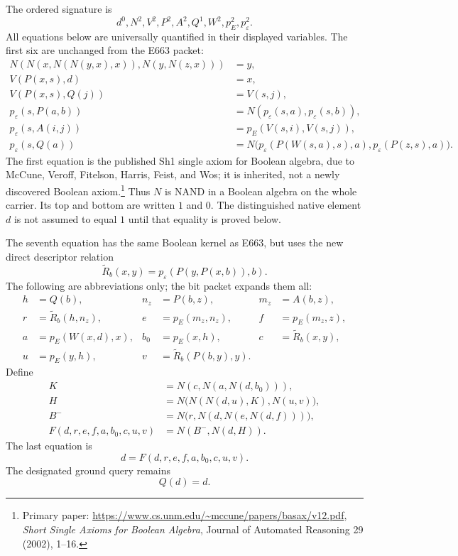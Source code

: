 The ordered signature is
\[
 d^0,N^2,V^2,P^2,A^2,Q^1,W^2,p_E^2,p_\varepsilon^2.
\]
All equations below are universally quantified in their displayed
variables.  The first six are unchanged from the E663 packet:
\begin{align}
 N(N(x,N(N(y,x),x)),N(y,N(z,x)))&=y,\label{eq:e639-sh1}\\
 V(P(x,s),d)&=x,\label{eq:e639-head}\\
 V(P(x,s),Q(j))&=V(s,j),\label{eq:e639-tail}\\
 p_\varepsilon(s,P(a,b))
   &=N(p_\varepsilon(s,a),p_\varepsilon(s,b)),\label{eq:e639-nand}\\
 p_\varepsilon(s,A(i,j))
   &=p_E(V(s,i),V(s,j)),\label{eq:e639-atom}\\
 p_\varepsilon(s,Q(a))
   &=N\bigl(p_\varepsilon(P(W(s,a),s),a),
              p_\varepsilon(P(z,s),a)\bigr).\label{eq:e639-binder}
\end{align}
The first equation is the published Sh1 single axiom for Boolean algebra,
due to McCune, Veroff, Fitelson, Harris, Feist, and Wos; it is inherited,
not a newly discovered Boolean axiom.\footnote{Primary paper:
\url{https://www.cs.unm.edu/~mccune/papers/basax/v12.pdf},
\emph{Short Single Axioms for Boolean Algebra}, Journal of Automated
Reasoning 29 (2002), 1--16.}
Thus $N$ is NAND in a Boolean algebra on the whole carrier.  Its top
and bottom are written $1$ and $0$.  The distinguished native element
$d$ is not assumed to equal $1$ until that equality is proved below.

The seventh equation has the same Boolean kernel as E663, but uses the
new direct descriptor relation
\begin{equation}
 \widetilde R_b(x,y)=p_\varepsilon(P(y,P(x,b)),b).
 \label{eq:e639-direct}
\end{equation}
The following are abbreviations only; the bit packet expands them all:
\begin{align*}
 h&=Q(b),& n_z&=P(b,z),&m_z&=A(b,z),\\
 r&=\widetilde R_b(h,n_z),&
 e&=p_E(m_z,n_z),&f&=p_E(m_z,z),\\
 a&=p_E(W(x,d),x),&b_0&=p_E(x,h),&c&=\widetilde R_b(x,y),\\
 u&=p_E(y,h),&v&=\widetilde R_b(P(b,y),y).
\end{align*}
Define
\begin{align*}
 K&=N(c,N(a,N(d,b_0))),\\
 H&=N\bigl(N(N(d,u),K),N(u,v)\bigr),\\
 B^-&=N\bigl(r,N(d,N(e,N(d,f)))\bigr),\\
 F(d,r,e,f,a,b_0,c,u,v)&=N(B^-,N(d,H)).
\end{align*}
The last equation is
\begin{equation}
                d=F(d,r,e,f,a,b_0,c,u,v).
 \label{eq:e639-closure}
\end{equation}
The designated ground query remains
\begin{equation}
                         Q(d)=d.
 \label{eq:e639-query}
\end{equation}

